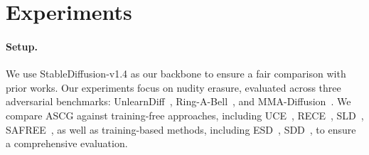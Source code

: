 

\section{Experiments}
\label{sec:exp}

\paragraph{Setup.}
We use StableDiffusion-v1.4 \citep{rombach2022high} as our backbone to ensure a fair comparison with prior works. Our experiments focus on nudity erasure, evaluated across three adversarial benchmarks: UnlearnDiff~\citep{zhang2024generate}, Ring-A-Bell~\citep{tsai2023ring}, and MMA-Diffusion~\citep{yang2024mma}.
We compare ASCG against training-free approaches, including UCE~\citep{gandikota2024unified}, RECE~\citep{gong2024reliable}, SLD~\citep{schramowski2023safe}, SAFREE~\citep{yoon2024safree}, as well as training-based methods, including ESD~\citep{gandikota2023erasing}, SDD~\citep{kim2023towards}, to ensure a comprehensive evaluation.

